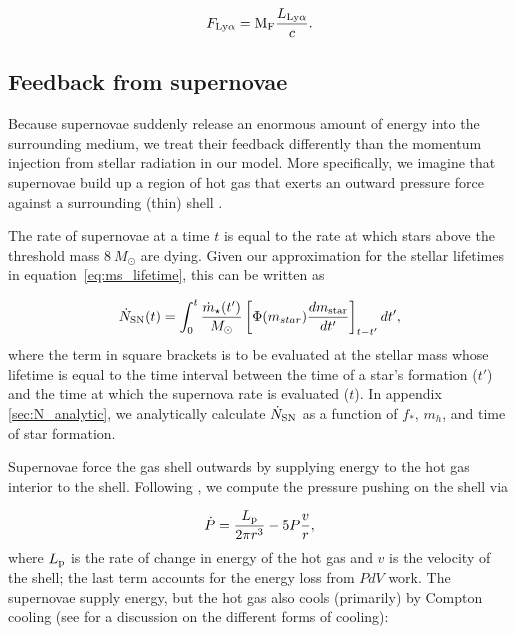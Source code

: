 \documentclass[a4paper,11pt]{article}
\begin{document}
\begin{equation}
    F_{\rm Ly\alpha} = \mathrm{M}_{\rm F} \frac{L_{\rm Ly\alpha}}{c}.
\end{equation}

\subsection{Feedback from supernovae}

Because supernovae suddenly release an enormous amount of energy into the surrounding medium, we treat their feedback differently than the momentum injection from stellar radiation in our model. 
More specifically, we imagine that supernovae build up a region of hot gas that exerts an outward pressure force against a surrounding (thin) shell \cite{Tegmark1993, Furlanetto2003_winds, Yamaguchi2023}. 

The rate of supernovae at a time $t$ is equal to the rate at which stars above the threshold mass $8 \ M_\odot$ are dying. Given our approximation for the stellar lifetimes in equation~\ref{eq:ms_lifetime}, this can be written as

\begin{equation}
    \dot{N}_{\rm SN}(t) = \int^{t}_{0} {\frac{\dot{m}_\star(t')}{M_\odot}} \left[ \Phi(m_{star}) \frac{d m_{\rm star}}{dt'} \right]_{t-t'} dt', \label{eq:dNsn_dt}
\end{equation}
%
where the term in square brackets is to be evaluated at the stellar mass whose lifetime is equal to the time interval between the time of a star's formation ($t'$) and the time at which the supernova rate is evaluated ($t$). In appendix \ref{sec:N_analytic}, we analytically calculate $\dot{N}_{\rm SN}$ as a function of $f_{*}$, $m_{h}$, and time of star formation.

Supernovae force the gas shell outwards by supplying energy to the hot gas interior to the shell. Following \cite{Tegmark1993}, we compute the pressure pushing on the shell via

\begin{equation}
    \dot{P} = \frac{L_{\rm p}}{2 \pi r^{3}} - 5 P \frac{v}{r}, \label{eq:dP_dt}
\end{equation}
%
where $L_{\rm p}$ is the rate of change in energy of the hot gas and $v$ is the velocity of the shell; the last term accounts for the energy loss from $PdV$ work. The supernovae supply energy, but the hot gas also cools (primarily) by Compton cooling (see \cite{Yamaguchi2023} for a discussion on the different forms of cooling):
\end{document}
